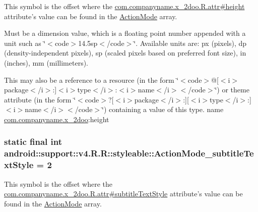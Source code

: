 This symbol is the offset where the \hyperlink{classcom_1_1companyname_1_1x__2doo_1_1_r_1_1attr_c32c88251553c82c893800333495ef41}{com.companyname.x\_\-2doo.R.attr\#height} attribute's value can be found in the \hyperlink{classandroid_1_1support_1_1v4_1_1_r_1_1styleable_cb0fd98eb07ef010055f95821e8da84e}{ActionMode} array.

Must be a dimension value, which is a floating point number appended with a unit such as \char`\"{}$<$code$>$14.5sp$<$/code$>$\char`\"{}. Available units are: px (pixels), dp (density-independent pixels), sp (scaled pixels based on preferred font size), in (inches), mm (millimeters). 

This may also be a reference to a resource (in the form \char`\"{}$<$code$>$@\mbox{[}$<$i$>$package$<$/i$>$:\mbox{]}$<$i$>$type$<$/i$>$:$<$i$>$name$<$/i$>$$<$/code$>$\char`\"{}) or theme attribute (in the form \char`\"{}$<$code$>$?\mbox{[}$<$i$>$package$<$/i$>$:\mbox{]}\mbox{[}$<$i$>$type$<$/i$>$:\mbox{]}$<$i$>$name$<$/i$>$$<$/code$>$\char`\"{}) containing a value of this type.  name \hyperlink{namespacecom_1_1companyname_1_1x__2doo}{com.companyname.x\_\-2doo}:height \hypertarget{classandroid_1_1support_1_1v4_1_1_r_1_1styleable_8f8b0c324c58b0dcb3f7272911eb5365}{
\subsubsection[{ActionMode\_\-subtitleTextStyle}]{\setlength{\rightskip}{0pt plus 5cm}static final int android::support::v4.R.R::styleable::ActionMode\_\-subtitleTextStyle = 2}}
\label{classandroid_1_1support_1_1v4_1_1_r_1_1styleable_8f8b0c324c58b0dcb3f7272911eb5365}


This symbol is the offset where the \hyperlink{classcom_1_1companyname_1_1x__2doo_1_1_r_1_1attr_19f2a7fd83211aa9b099862a6f8def04}{com.companyname.x\_\-2doo.R.attr\#subtitleTextStyle} attribute's value can be found in the \hyperlink{classandroid_1_1support_1_1v4_1_1_r_1_1styleable_cb0fd98eb07ef010055f95821e8da84e}{ActionMode} array.

